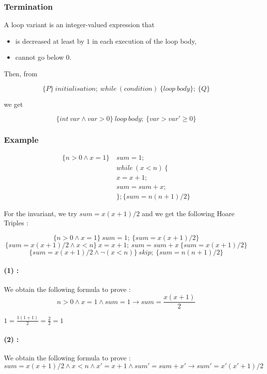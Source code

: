 \documentclass[a4paper,11pt]{report}
\newcommand{\HTriple}[3]{\{#1\}\ #2 \ \{#3\}}
\begin{document}
\subsubsection{Termination}

A loop variant is an integer-valued expression that
\begin{itemize}
\item is decreased at least by $1$ in each execution of the loop body,
\item cannot go below $0$.
\end{itemize}

Then, from

\[
  \{P\}\ initialisation;\ while\ (condition)\ \{loop\ body\}; \ \{Q\}
\]

we get

\[
  \HTriple{int\ var \wedge var > 0}{loop\ body;}{var > var' \geq 0}
\]

\subsubsection{Example}

\begin{align*}
  \{n > 0 \wedge x = 1\}\ &sum = 1; \\
                          &while\ (x < n)\ \{ \\
                          &x = x + 1; \\
                          & sum = sum + x; \\
                          &\}; \{sum = n(n+1)/2\}
\end{align*}

For the invariant, we try $sum = x(x+1)/2$ and we get the following Hoare Triples :

\[\HTriple{n > 0 \wedge x = 1}{sum = 1;}{sum = x(x+1)/2}\]
\[\HTriple{sum = x(x+1)/2 \wedge x < n}{x = x+1;\ sum = sum + x}{sum =
    x(x+1)/2}\]
\[\HTriple{sum = x(x+1)/2 \wedge \neg(x < n)}{skip;}{sum = n(n+1)/2}\]

\paragraph{(1) :} We obtain the following formula to prove :
\[
  n > 0 \wedge x = 1 \wedge sum = 1 \to sum = \frac{x(x+1)}{2}
\]

$1 = \frac{1 (1 + 1)}{2} = \frac{2}{2} = 1$

\paragraph{(2) :} We obtain the following formula to prove :
\[
  sum = x(x+1)/2 \wedge x < n \wedge x' = x + 1 \wedge sum' = sum + x' \to sum' = x'(x'+1)/2
\]
\end{document}
